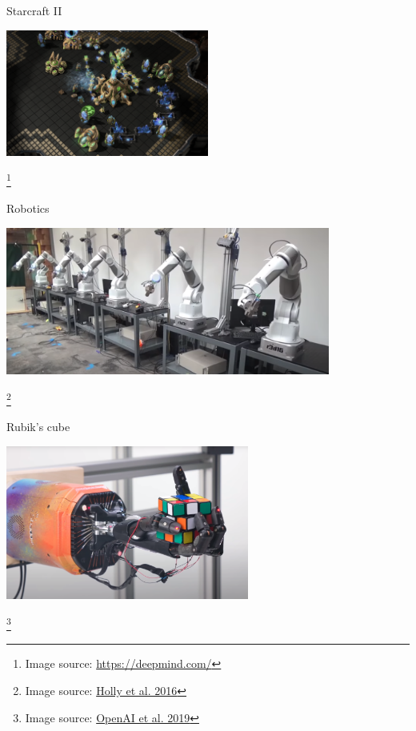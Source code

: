 \documentclass[aspectratio=169]{../latex_main/tntbeamer}  %
\begin{document}
\begin{frame}[c]{Starcraft II~}
	
	\centering
	\includegraphics[width=0.5\textwidth]{images/starcraftii.png}
	
\footnote{Image source: \url{https://deepmind.com/}}
	
\end{frame}
\begin{frame}[c]{Robotics~}
	
	\centering
	\includegraphics[width=0.8\textwidth]{images/robotic.png}
	
	\footnote{Image source: \href{https://www.youtube.com/watch?v=ZhsEKTo7V04}{Holly et al. 2016}}
	
\end{frame}
\begin{frame}[c]{Rubik's cube~}
	
	\centering
	\includegraphics[width=0.6\textwidth]{images/rubiks_cube.png}
	
	\footnote{Image source: \href{https://openai.com/blog/solving-rubiks-cube/}{OpenAI et al. 2019}}
	
\end{frame}
\end{document}
